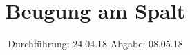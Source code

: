 

\subject{406}
\title{Beugung am Spalt}
\date{%
  Durchführung: 24.04.18
  \hspace{3em}
  Abgabe: 08.05.18
}



\maketitle
\thispagestyle{empty}
\tableofcontents
\newpage







\printbibliography{}


